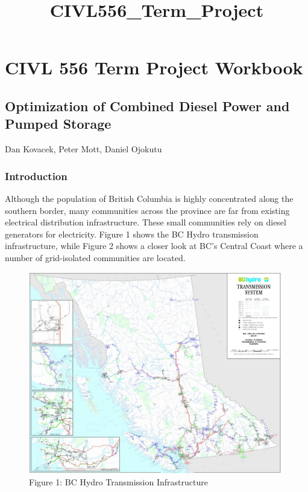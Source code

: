\documentclass[11pt]{article}
\title{CIVL556\_Term\_Project}
\makeatletter
\def\maxwidth{\ifdim\Gin@nat@width>\linewidth\linewidth
    \else\Gin@nat@width\fi}
\let\Oldincludegraphics\includegraphics
\renewcommand{\includegraphics}[1]{\Oldincludegraphics[width=.8\maxwidth]{#1}}
\makeatother
\begin{document}
    
    
    \maketitle
    
    

    
    \hypertarget{civl-556-term-project-workbook}{%
\section{CIVL 556 Term Project
Workbook}\label{civl-556-term-project-workbook}}

\hypertarget{optimization-of-combined-diesel-power-and-pumped-storage}{%
\subsection{Optimization of Combined Diesel Power and Pumped
Storage}\label{optimization-of-combined-diesel-power-and-pumped-storage}}

Dan Kovacek, Peter Mott, Daniel Ojokutu

\hypertarget{introduction}{%
\subsubsection{Introduction}\label{introduction}}

Although the population of British Columbia is highly concentrated along
the southern border, many communities across the province are far from
existing electrical distribution infrastructure. These small communities
rely on diesel generators for electricity. Figure 1 shows the BC Hydro
transmission infrastructure, while Figure 2 shows a closer look at BC's
Central Coast where a number of grid-isolated communities are located.

\begin{figure}
\centering
\includegraphics{images/transmission.jpg}
\caption{Figure 1: BC Hydro Transmission Infrastructure}
\end{figure}
\end{document}
